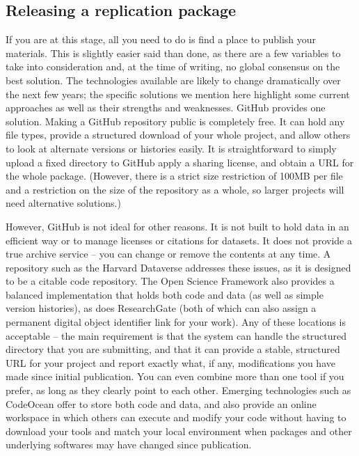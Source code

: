 \subsection{Releasing a replication package}

If you are at this stage,
all you need to do is find a place to publish your materials.
This is slightly easier said than done,
as there are a few variables to take into consideration
and, at the time of writing, no global consensus on the best solution.
The technologies available are likely to change dramatically
over the next few years;
the specific solutions we mention here highlight some current approaches
as well as their strengths and weaknesses.
GitHub provides one solution.
Making a GitHub repository public is completely free.
It can hold any file types,
provide a structured download of your whole project,
and allow others to look at alternate versions or histories easily.
It is straightforward to simply upload a fixed directory to GitHub
apply a sharing license, and obtain a URL for the whole package.
(However, there is a strict size restriction of 100MB per file and
a restriction on the size of the repository as a whole,
so larger projects will need alternative solutions.)

However, GitHub is not ideal for other reasons.
It is not built to hold data in an efficient way
or to manage licenses or citations for datasets.
It does not provide a true archive service --
you can change or remove the contents at any time.
A repository such as the Harvard Dataverse
addresses these issues, as it is designed to be a citable code repository.
The Open Science Framework
also provides a balanced implementation
that holds both code and data (as well as simple version histories),
as does ResearchGate
(both of which can also assign a permanent digital object identifier link for your work).
Any of these locations is acceptable --
the main requirement is that the system can handle
the structured directory that you are submitting,
and that it can provide a stable, structured URL for your project
and report exactly what, if any, modifications you have made since initial publication.
You can even combine more than one tool if you prefer,
as long as they clearly point to each other.
Emerging technologies such as CodeOcean
offer to store both code and data,
and also provide an online workspace in which others
can execute and modify your code
without having to download your tools and match your local environment
when packages and other underlying softwares may have changed since publication.

